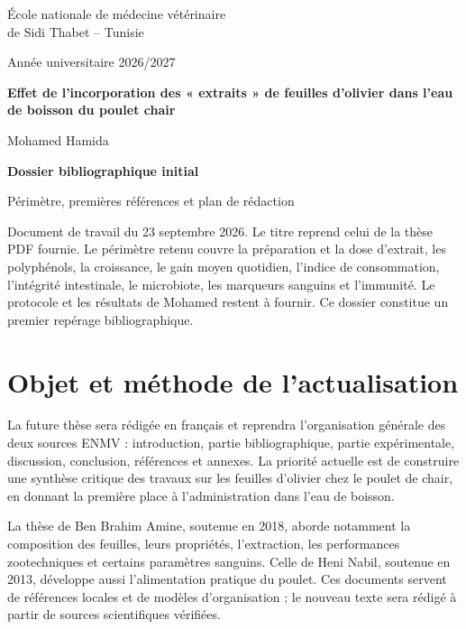 \documentclass[11pt,a4paper]{article}
\newcommand{\titrethese}{Effet de l'incorporation des « extraits » de feuilles d'olivier dans l'eau de boisson du poulet chair}
\begin{document}
\hypersetup{pageanchor=false}
\begin{titlepage}
\centering
{\large École nationale de médecine vétérinaire\\de Sidi Thabet -- Tunisie\par}
\vspace{1.4cm}
{\large Année universitaire 2026/2027\par}
\vspace{1.6cm}
{\LARGE\bfseries \titrethese\par}
\vspace{1.5cm}
{\Large Mohamed Hamida\par}
\vspace{1.5cm}
{\Large\bfseries Dossier bibliographique initial\par}
{\large Périmètre, premières références et plan de rédaction\par}
\vfill
\begin{minipage}{0.88\textwidth}
\small
Document de travail du 23 septembre 2026. Le titre reprend celui de la thèse PDF fournie. Le périmètre retenu couvre la préparation et la dose d'extrait, les polyphénols, la croissance, le gain moyen quotidien, l'indice de consommation, l'intégrité intestinale, le microbiote, les marqueurs sanguins et l'immunité. Le protocole et les résultats de Mohamed restent à fournir. Ce dossier constitue un premier repérage bibliographique.
\end{minipage}
\vspace{1cm}
\end{titlepage}
\hypersetup{pageanchor=true}

\section{Objet et méthode de l'actualisation}

La future thèse sera rédigée en français et reprendra l'organisation générale des deux sources ENMV : introduction, partie bibliographique, partie expérimentale, discussion, conclusion, références et annexes. La priorité actuelle est de construire une synthèse critique des travaux sur les feuilles d'olivier chez le poulet de chair, en donnant la première place à l'administration dans l'eau de boisson.

La thèse de Ben Brahim Amine, soutenue en 2018, aborde notamment la composition des feuilles, leurs propriétés, l'extraction, les performances zootechniques et certains paramètres sanguins. Celle de Heni Nabil, soutenue en 2013, développe aussi l'alimentation pratique du poulet. Ces documents servent de références locales et de modèles d'organisation ; le nouveau texte sera rédigé à partir de sources scientifiques vérifiées.
\end{document}
